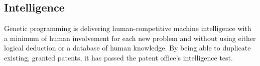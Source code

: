 \documentclass[../main.tex]{subfiles}
\begin{document}
\subsection{Intelligence}
Genetic programming is delivering human-competitive machine intelligence with a minimum of human involvement for each
new problem and without using either logical deduction or a database of human knowledge. By being able to duplicate
existing, granted patents, it has passed the patent office's intelligence test.
\end{document}
